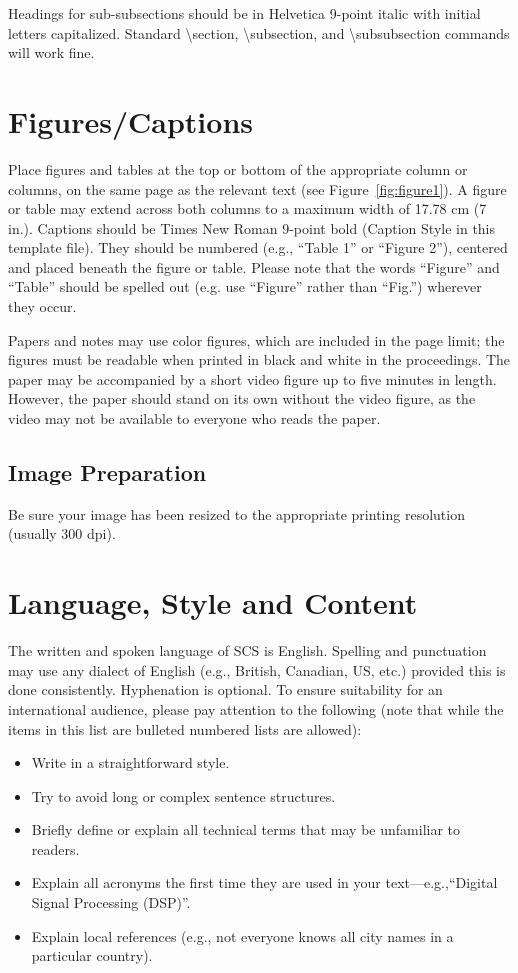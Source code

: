\documentclass{scsPaperFormattingTemplate-LaTex-Revised20160302}
\begin{document}
Headings for sub-subsections should be in Helvetica 9-point italic
with initial letters capitalized.  Standard {\textbackslash}section,
{\textbackslash}subsection, and {\textbackslash}subsubsection commands
will work fine.

\section{Figures/Captions}

Place figures and tables at the top or bottom of the appropriate column or columns, on the same page as the relevant text (see Figure~\ref{fig:figure1}). 
A figure or table may extend across both columns to a maximum width of 17.78 cm (7 in.). Captions should be Times New Roman 9-point bold (Caption Style in this template file). They should be numbered (e.g., “Table 1” or “Figure 2”), centered and placed beneath the figure or table. Please note that the words “Figure” and “Table” should be spelled out (e.g. use “Figure” rather than “Fig.”) wherever they occur. 

Papers and notes may use color figures, which are included in the page limit; the figures must be readable when printed in black and white in the proceedings.
The paper may be accompanied by a short video figure up to five minutes in length. However, the paper should stand on its own without the video figure, as the video may not be available to everyone who reads the paper.

\subsection{Image Preparation}

Be sure your image has been resized to the appropriate printing resolution (usually 300 dpi).

\section{Language, Style and Content}

The written and spoken language of SCS is English. Spelling and punctuation may use any dialect of English (e.g., British, Canadian, US, etc.) provided this is done consistently. Hyphenation is optional. To ensure suitability for an international audience, please pay attention to the following (note that while the items in this list are bulleted numbered lists are allowed):

\begin{itemize}
\item Write in a straightforward style.
\item Try to avoid long or complex sentence structures.
\item Briefly define or explain all technical terms that may be unfamiliar to readers.
\item Explain all acronyms the first time they are used in your text---e.g.,``Digital Signal Processing (DSP)''.
\item Explain local references (e.g., not everyone knows all city names in a particular country).
\end{itemize}
\end{document}
